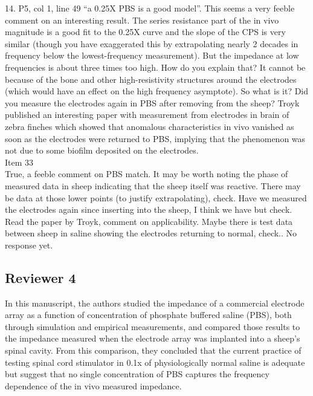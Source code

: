 \documentclass[journal, a4paper]{IEEEtran}
\begin{document}
{{14. P5, col 1, line 49 ``a 0.25X PBS is a good model''.  This seems a very feeble comment on an interesting result. The series resistance part of the in vivo magnitude is a good fit to the 0.25X curve and the slope of the CPS is very similar (though you have exaggerated this by extrapolating nearly 2 decades in frequency below the lowest-frequency measurement). But the impedance at low frequencies is about three times too high. How do you explain that? It cannot be because of the bone and other high-resistivity structures around the electrodes (which would have an effect on the high frequency asymptote). So what is it? Did you measure the electrodes again in PBS after removing from the sheep? Troyk published an interesting paper with measurement from electrodes in brain of zebra finches which showed that anomalous characteristics in vivo vanished as soon as the electrodes were returned to PBS, implying that the phenomenon was not due to some biofilm deposited on the electrodes.\\
{\color{OliveGreen}
    Item 33\\
    {\color{Red} True, a feeble comment on PBS match. It may be worth noting the phase of measured data in sheep indicating that the sheep itself was reactive. There may be data at those lower points (to justify extrapolating), check. Have we measured the electrodes again since inserting into the sheep, I think we have but check.  Read the paper by Troyk, comment on applicability. Maybe there is test data between sheep in saline showing the electrodes returning to normal, check.}.
    No response yet.
}\\
}

\subsection*{Reviewer 4}
{\color{blue}
In this manuscript, the authors studied the impedance of a commercial electrode array as a function of concentration of phosphate buffered saline (PBS), both through simulation and empirical measurements, and compared those results to the impedance measured when the electrode array was implanted into a sheep's spinal cavity. From this comparison, they concluded that the current practice of testing spinal cord stimulator in 0.1x of physiologically normal saline is adequate but suggest that no single concentration of PBS captures the frequency dependence of the in vivo measured impedance.\\

}}
\end{document}
